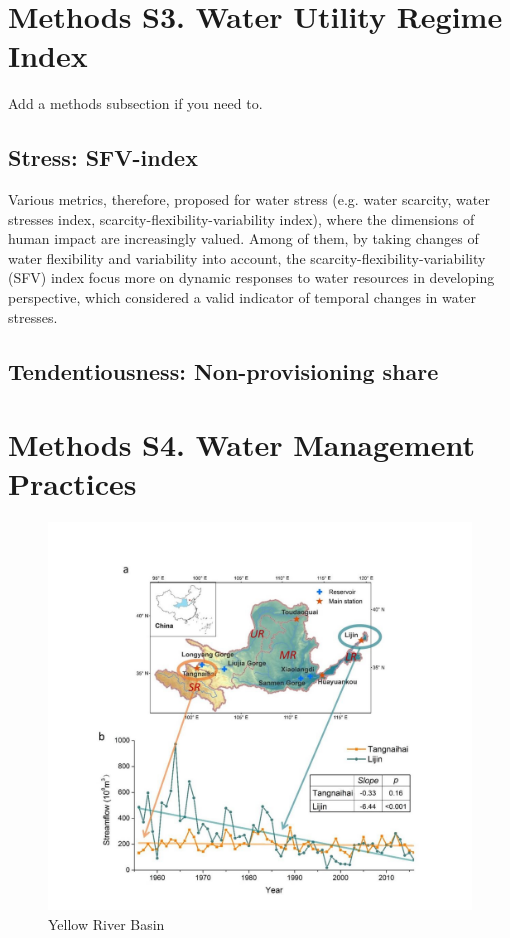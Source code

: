 \documentclass[9pt,twoside,lineno]{pnas-new}
\begin{document}
\section*{Methods S3. Water Utility Regime Index}
Add a methods subsection if you need to.

\subsection*{Stress: SFV-index}
	Various metrics, therefore, proposed for water stress (e.g. water scarcity, water stresses index, scarcity-flexibility-variability index), where the dimensions of human impact are increasingly valued.
    Among of them, by taking changes of water flexibility and variability into account,	the scarcity-flexibility-variability (SFV) index focus more on dynamic responses to water resources in developing perspective, which considered a valid indicator of temporal changes in water stresses.
    
\subsection*{Tendentiousness: Non-provisioning share}

\section{Methods S4. Water Management Practices}

\begin{figure}
    \centering
    \includegraphics[width=\textwidth]{../../figures/supplementary_information/YRB.jpg}
    \caption{Yellow River Basin}
\end{figure}
\end{document}
